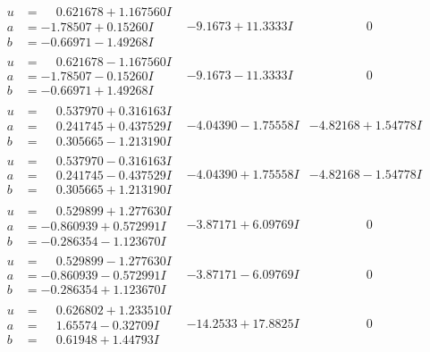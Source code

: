 \documentclass[1p]{elsarticle_modified}
\theoremstyle{definition}
\begin{document}
$$\begin{array}{c|c|c}
\begin{aligned}
u &= \phantom{-}0.621678 + 1.167560 I \\
a &= -1.78507 + 0.15260 I \\
b &= -0.66971 - 1.49268 I\end{aligned}
 & -9.1673 + 11.3333 I & \phantom{-0.000000 } 0 \\ \hline\begin{aligned}
u &= \phantom{-}0.621678 - 1.167560 I \\
a &= -1.78507 - 0.15260 I \\
b &= -0.66971 + 1.49268 I\end{aligned}
 & -9.1673 - 11.3333 I & \phantom{-0.000000 } 0 \\ \hline\begin{aligned}
u &= \phantom{-}0.537970 + 0.316163 I \\
a &= \phantom{-}0.241745 + 0.437529 I \\
b &= \phantom{-}0.305665 - 1.213190 I\end{aligned}
 & -4.04390 - 1.75558 I & -4.82168 + 1.54778 I \\ \hline\begin{aligned}
u &= \phantom{-}0.537970 - 0.316163 I \\
a &= \phantom{-}0.241745 - 0.437529 I \\
b &= \phantom{-}0.305665 + 1.213190 I\end{aligned}
 & -4.04390 + 1.75558 I & -4.82168 - 1.54778 I \\ \hline\begin{aligned}
u &= \phantom{-}0.529899 + 1.277630 I \\
a &= -0.860939 + 0.572991 I \\
b &= -0.286354 - 1.123670 I\end{aligned}
 & -3.87171 + 6.09769 I & \phantom{-0.000000 } 0 \\ \hline\begin{aligned}
u &= \phantom{-}0.529899 - 1.277630 I \\
a &= -0.860939 - 0.572991 I \\
b &= -0.286354 + 1.123670 I\end{aligned}
 & -3.87171 - 6.09769 I & \phantom{-0.000000 } 0 \\ \hline\begin{aligned}
u &= \phantom{-}0.626802 + 1.233510 I \\
a &= \phantom{-}1.65574 - 0.32709 I \\
b &= \phantom{-}0.61948 + 1.44793 I\end{aligned}
 & -14.2533 + 17.8825 I & \phantom{-0.000000 } 0 \\ \hline\begin{aligned}

\end{aligned}
\end{array}$$
\end{document}
